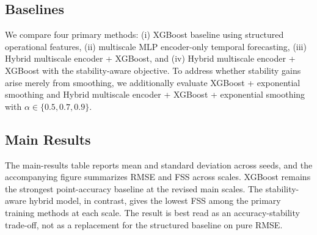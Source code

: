 \documentclass[10pt,conference]{IEEEtran}
\begin{document}
\subsection{Baselines}
We compare four primary methods: (i) XGBoost baseline using structured operational features, (ii) multiscale MLP encoder-only temporal forecasting, (iii) Hybrid multiscale encoder + XGBoost, and (iv) Hybrid multiscale encoder + XGBoost with the stability-aware objective. To address whether stability gains arise merely from smoothing, we additionally evaluate XGBoost + exponential smoothing and Hybrid multiscale encoder + XGBoost + exponential smoothing with $\alpha \in \{0.5,0.7,0.9\}$.

\subsection{Main Results}
The main-results table reports mean and standard deviation across seeds, and the accompanying figure summarizes RMSE and FSS across scales. XGBoost remains the strongest point-accuracy baseline at the revised main scales. The stability-aware hybrid model, in contrast, gives the lowest FSS among the primary training methods at each scale. The result is best read as an accuracy-stability trade-off, not as a replacement for the structured baseline on pure RMSE.
\end{document}
